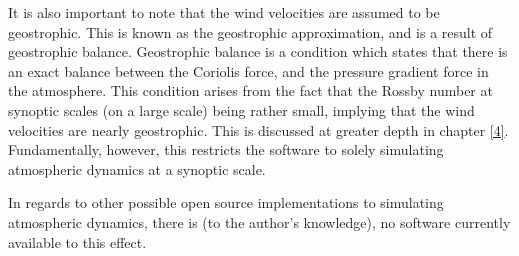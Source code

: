 It is also important to note that the wind velocities are assumed to be geostrophic. This is known as the geostrophic approximation, and is a result of geostrophic balance. Geostrophic balance is a condition which states that there is an exact balance between the Coriolis force, and the pressure gradient force in the atmosphere. This condition arises from the fact that the Rossby number at synoptic scales (on a large scale) being rather small, implying that the wind velocities are nearly geostrophic\cite{UiO}. This is discussed at greater depth in chapter \ref{4}. Fundamentally, however, this restricts the software to solely simulating atmospheric dynamics at a synoptic scale.

In regards to other possible open source implementations to simulating atmospheric dynamics, there is (to the author's knowledge), no software currently available to this effect.